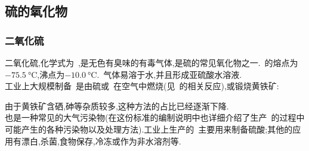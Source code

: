 \documentclass{ctexbook}
\begin{document}
\subsection{硫的氧化物}
\subsubsection{二氧化硫}
二氧化硫,化学式为~,是无色有臭味的有毒气体,是硫的常见氧化物之一.~的熔点为$\SI{-75.5}{\celsius}$,沸点为$\SI{-10.0}{\celsius}$.~气体易溶于水,并且形成亚硫酸水溶液.\\
\indent 工业上大规模制备~是由硫或~在空气中燃烧(见~的相关反应),或锻烧黄铁矿:
\begin{tightcenter}
\end{tightcenter}
由于黄铁矿含硒,砷等杂质较多,这种方法的占比已经逐渐下降.\\
\indent {}也是一种常见的大气污染物\cite{GB26132-2010}(在这份标准的编制说明中也详细介绍了生产~的过程中可能产生的各种污染物以及处理方法).工业上生产的~主要用来制备硫酸;其他的应用有漂白,杀菌,食物保存,冷冻或作为非水溶剂等.
\end{document}
